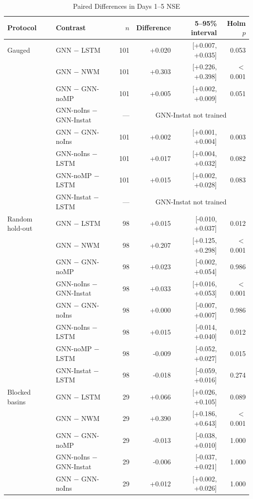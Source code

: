 \begin{table}
\caption{Paired Differences in Days 1--5 NSE}
\label{tab:contrasts}
\footnotesize
\setlength{\parindent}{0pt}
\renewcommand{\arraystretch}{1.2}
\begin{tabular}{@{}llrrrr@{}}
\toprule
Protocol & Contrast & $n$ & Difference & 5--95\% interval & Holm $p$ \\
\midrule
Gauged & GNN $-$ LSTM & 101 & +0.020 & [+0.007, +0.035] & 0.053 \\
 & GNN $-$ NWM & 101 & +0.303 & [+0.226, +0.398] & $<$0.001 \\
 & GNN $-$ GNN-noMP & 101 & +0.005 & [+0.002, +0.009] & 0.051 \\
 & GNN-noIns $-$ GNN-Instat & --- & \multicolumn{3}{c}{GNN-Instat not trained} \\
 & GNN $-$ GNN-noIns & 101 & +0.002 & [+0.001, +0.004] & 0.003 \\
 & GNN-noIns $-$ LSTM & 101 & +0.017 & [+0.004, +0.032] & 0.082 \\
 & GNN-noMP $-$ LSTM & 101 & +0.015 & [+0.002, +0.028] & 0.083 \\
 & GNN-Instat $-$ LSTM & --- & \multicolumn{3}{c}{GNN-Instat not trained} \\
\addlinespace
Random hold-out & GNN $-$ LSTM & 98 & +0.015 & [-0.010, +0.037] & 0.012 \\
 & GNN $-$ NWM & 98 & +0.207 & [+0.125, +0.298] & $<$0.001 \\
 & GNN $-$ GNN-noMP & 98 & +0.023 & [-0.002, +0.054] & 0.986 \\
 & GNN-noIns $-$ GNN-Instat & 98 & +0.033 & [+0.016, +0.053] & $<$0.001 \\
 & GNN $-$ GNN-noIns & 98 & +0.000 & [-0.007, +0.007] & 0.986 \\
 & GNN-noIns $-$ LSTM & 98 & +0.015 & [-0.014, +0.040] & 0.012 \\
 & GNN-noMP $-$ LSTM & 98 & -0.009 & [-0.052, +0.027] & 0.015 \\
 & GNN-Instat $-$ LSTM & 98 & -0.018 & [-0.059, +0.016] & 0.274 \\
\addlinespace
Blocked basins & GNN $-$ LSTM & 29 & +0.066 & [+0.026, +0.105] & 0.089 \\
 & GNN $-$ NWM & 29 & +0.390 & [+0.186, +0.643] & $<$0.001 \\
 & GNN $-$ GNN-noMP & 29 & -0.013 & [-0.038, +0.010] & 1.000 \\
 & GNN-noIns $-$ GNN-Instat & 29 & -0.006 & [-0.037, +0.021] & 1.000 \\
 & GNN $-$ GNN-noIns & 29 & +0.012 & [+0.002, +0.026] & 1.000 \\

\end{tabular}
\end{table}
